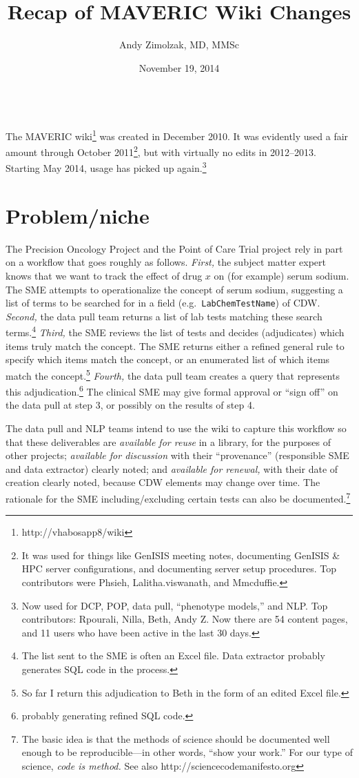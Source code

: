 \documentclass{tufte-handout}
\title{Recap of MAVERIC Wiki Changes}
\author{Andy Zimolzak, MD, MMSc}
\date{November 19, 2014}
\begin{document}
\maketitle

~\\

The MAVERIC wiki\footnote{http://vhabosapp8/wiki} was created in
December 2010. It was evidently used a fair amount through October
2011\footnote{It was used for things like GenISIS meeting notes,
  documenting GenISIS \& HPC server configurations, and documenting
  server setup procedures. Top contributors were Phsieh,
  Lalitha.viswanath, and Mmcduffie.}, but with virtually no edits in
2012--2013. Starting May 2014, usage has picked up again.\footnote{Now
  used for DCP, POP, data pull, ``phenotype models,'' and NLP. Top
  contributors: Rpourali, Nilla, Beth, Andy Z. Now there are 54
  content pages, and 11 users who have been active in the last 30
  days.}

\section{Problem/niche}

The Precision Oncology Project and the Point of Care Trial project
rely in part on a workflow that goes roughly as follows. \emph{First,}
the subject matter expert knows that we want to track the effect of
drug $x$ on (for example) serum sodium. The SME attempts to
operationalize the concept of serum sodium, suggesting a list of terms
to be searched for in a field (e.g.\ \texttt{LabChemTestName}) of CDW.
\emph{Second,} the data pull team returns a list of lab tests matching
these search terms.\footnote{The list sent to the SME is often an
  Excel file. Data extractor probably generates SQL code in the
  process.} \emph{Third,} the SME reviews the list of tests and
decides (adjudicates) which items truly match the concept. The SME
returns either a refined general rule to specify which items match the
concept, or an enumerated list of which items match the
concept.\footnote{So far I return this adjudication to Beth in the
  form of an edited Excel file.} \emph{Fourth,} the data pull team
creates a query that represents this adjudication.\footnote{probably
  generating refined SQL code.} The clinical SME may give formal
approval or ``sign off'' on the data pull at step 3, or possibly on
the results of step 4.

The data pull and NLP teams intend to use the wiki to capture this
workflow so that these deliverables are \emph{available for reuse} in
a library, for the purposes of other projects; \emph{available for
  discussion} with their ``provenance'' (responsible SME and data
extractor) clearly noted; and \emph{available for renewal,} with their
date of creation clearly noted, because CDW elements may change over
time. The rationale for the SME including/excluding certain tests can
also be documented.\footnote{The basic idea is that the methods of
  science should be documented well enough to be reproducible---in
  other words, ``show your work.'' For our type of science, \emph{code
    is method.} See also http://sciencecodemanifesto.org}
\end{document}
